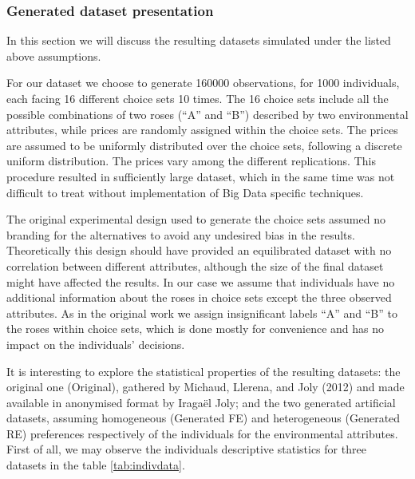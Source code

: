 \documentclass[12pt,]{article}
\begin{document}
\FloatBarrier

\hypertarget{generated-dataset-presentation}{%
\subsubsection{Generated dataset
presentation}\label{generated-dataset-presentation}}

\FloatBarrier

In this section we will discuss the resulting datasets simulated under
the listed above assumptions.

For our dataset we choose to generate 160000 observations, for 1000
individuals, each facing 16 different choice sets 10 times. The 16
choice sets include all the possible combinations of two roses (``A''
and ``B'') described by two environmental attributes, while prices are
randomly assigned within the choice sets. The prices are assumed to be
uniformly distributed over the choice sets, following a discrete uniform
distribution. The prices vary among the different replications. This
procedure resulted in sufficiently large dataset, which in the same time
was not difficult to treat without implementation of Big Data specific
techniques.

The original experimental design used to generate the choice sets
assumed no branding for the alternatives to avoid any undesired bias in
the results. Theoretically this design should have provided an
equilibrated dataset with no correlation between different attributes,
although the size of the final dataset might have affected the results.
In our case we assume that individuals have no additional information
about the roses in choice sets except the three observed attributes. As
in the original work we assign insignificant labels ``A'' and ``B'' to
the roses within choice sets, which is done mostly for convenience and
has no impact on the individuals' decisions.

It is interesting to explore the statistical properties of the resulting
datasets: the original one (Original), gathered by Michaud, Llerena, and
Joly (2012) and made available in anonymised format by Iragaël Joly; and
the two generated artificial datasets, assuming homogeneous (Generated
FE) and heterogeneous (Generated RE) preferences respectively of the
individuals for the environmental attributes. First of all, we may
observe the individuals descriptive statistics for three datasets in the
table \ref{tab:indivdata}.
\end{document}
